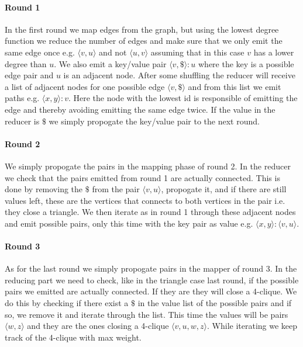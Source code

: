\documentclass{article}
\begin{document}
\paragraph{Round 1}
In the first round we map edges from the graph, but using the lowest degree function we reduce the number of edges and make sure that we only emit the same edge once e.g. $\langle v,u\rangle$ and not $\langle u,v\rangle$ assuming that in this case $v$ has a lower degree than $u$. We also emit a key/value pair $\langle v,\$\rangle :u$ where the key is a possible edge pair and $u$ is an adjacent node. After some shuffling the reducer will receive a list of adjacent nodes for one possible edge $\langle v,\$\rangle$ and from this list we emit paths e.g. $\langle x,y\rangle :v$. Here the node with the lowest id is responsible of emitting the edge and thereby avoiding emitting the same edge twice.
If the value in the reducer is $\$$ we simply propogate the key/value pair to the next round.

\paragraph{Round 2}
We simply propogate the pairs in the mapping phase of round 2. In the reducer we check that the pairs emitted from round 1 are actually connected. This is done by removing the $\$$ from the pair $\langle v,u\rangle$, propogate it, and if there are still values left, these are the vertices that connects to both vertices in the pair i.e. they close a triangle. We then iterate as in round 1 through these adjacent nodes and emit possible pairs, only this time with the key pair as value e.g. $\langle x,y \rangle :\langle v,u \rangle$.

\paragraph{Round 3}
As for the last round we simply propogate pairs in the mapper of round 3. In the reducing part we need to check, like in the triangle case last round, if the possible pairs we emitted are actually connected. If they are they will close a 4-clique. We do this by checking if there exist a $\$$ in the value list of the possible pairs and if so, we remove it and iterate through the list. This time the values will be pairs $\langle w,z \rangle$ and they are the ones closing a 4-clique $\langle v,u,w,z \rangle$. While iterating we keep track of the 4-clique with max weight.
\end{document}
